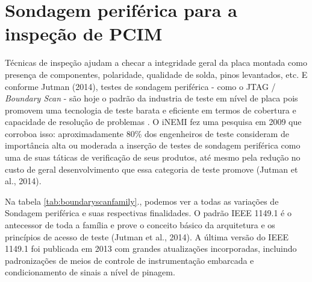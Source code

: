 \section{Sondagem periférica para a inspeção de PCIM}

Técnicas de inspeção ajudam a checar a integridade geral da placa montada como presença de componentes, polaridade, qualidade de solda, pinos levantados, etc. E conforme Jutman (2014), testes de sondagem periférica - como o JTAG / \textit{Boundary Scan} -  são hoje o padrão da industria de teste em nível de placa pois promovem uma tecnologia de teste barata e eficiente em termos de cobertura e capacidade de resolução de problemas \nocite{parker2012boundary}. O iNEMI fez uma pesquisa em 2009 \citep{geiger2009boundary} que corroboa isso: aproximadamente 80\% dos engenheiros de teste consideram de importância alta ou moderada a inserção de testes de sondagem periférica como uma de suas táticas de verificação de seus produtos, até mesmo pela redução no custo de geral desenvolvimento que essa categoria de teste promove (Jutman et al., 2014). 

Na tabela \ref{tab:boundaryscanfamily}., podemos ver a todas as variações de Sondagem periférica e suas respectivas finalidades. O padrão IEEE 1149.1 \citep{ieee11491old} é o antecessor de toda a família e prove o conceito básico da arquitetura e os princípios de acesso de teste (Jutman et al., 2014). A última versão do IEEE 1149.1 foi publicada em 2013 \citep{ieee11491yr2013} com grandes atualizações incorporadas, incluindo padronizações de meios de controle de instrumentação embarcada e condicionamento de sinais a nível de pinagem.

